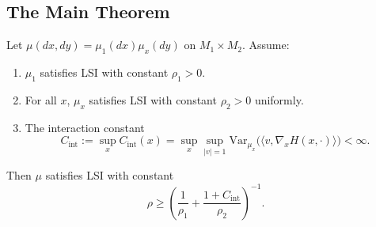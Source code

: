 \subsection{The Main Theorem}

\begin{theorem}\label{thm:interaction-tensorization}
Let $\mu(dx,dy) = \mu_1(dx) \mu_x(dy)$ on $M_1 \times M_2$. Assume:
\begin{enumerate}
    \item $\mu_1$ satisfies LSI with constant $\rho_1 > 0$.
    \item For all $x$, $\mu_x$ satisfies LSI with constant $\rho_2 > 0$ uniformly.
    \item The interaction constant 
    \begin{equation}
        C_{\mathrm{int}} := \sup_x C_{\mathrm{int}}(x) = \sup_x \sup_{|v|=1} \mathrm{Var}_{\mu_x}\big(\langle v, \nabla_x H(x,\cdot) \rangle\big) < \infty.
    \end{equation}
\end{enumerate}
Then $\mu$ satisfies LSI with constant
\begin{equation}
    \rho \geq \left( \frac{1}{\rho_1} + \frac{1 + C_{\mathrm{int}}}{\rho_2} \right)^{-1}.
\end{equation}
\end{theorem}

